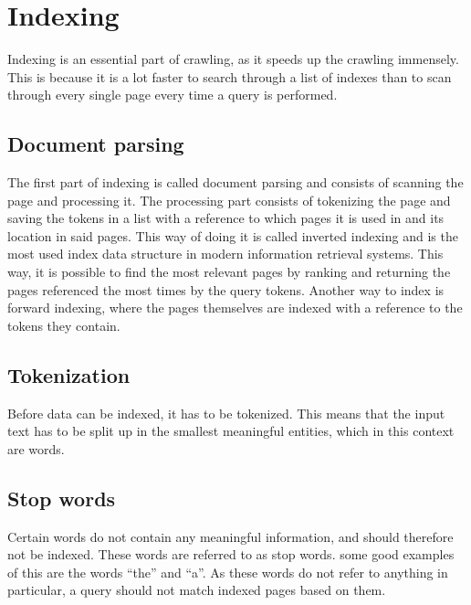 \section{Indexing} \label{sec:indexing}
Indexing is an essential part of crawling, as it speeds up the crawling
immensely. This is because it is a lot faster to search through a list of
indexes than to scan through every single page every time a query is performed.
\subsection{Document parsing}
The first part of indexing is called document parsing and consists of scanning
the page and processing it. The processing part consists of tokenizing the page
and saving the tokens in a list with a reference to which pages it is used in
and its location in said pages. This way of doing it is called inverted indexing
and is the most used index data structure in modern information retrieval
systems. This way, it is possible to find the most relevant pages by ranking and
returning the pages referenced the most times by the query tokens. Another way
to index is forward indexing, where the pages themselves are indexed with a
reference to the tokens they contain.
\subsection{Tokenization}
Before data can be indexed, it has to be tokenized. This means that the input
text has to be split up in the smallest meaningful entities, which in this
context are words.
\subsection{Stop words}
Certain words do not contain any meaningful information, and should therefore
not be indexed. These words are referred to as stop words. some good examples of
this are the words ``the'' and ``a''. As these words do not refer to anything in
particular, a query should not match indexed pages based on them.


